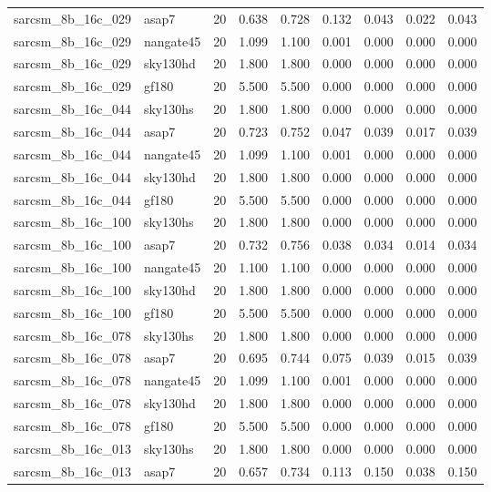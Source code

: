 \begin{tabular}{llrrrrrrr}
sarcsm\_8b\_16c\_029 & asap7 & 20 & 0.638 & 0.728 & 0.132 & 0.043 & 0.022 & 0.043 \\
sarcsm\_8b\_16c\_029 & nangate45 & 20 & 1.099 & 1.100 & 0.001 & 0.000 & 0.000 & 0.000 \\
sarcsm\_8b\_16c\_029 & sky130hd & 20 & 1.800 & 1.800 & 0.000 & 0.000 & 0.000 & 0.000 \\
sarcsm\_8b\_16c\_029 & gf180 & 20 & 5.500 & 5.500 & 0.000 & 0.000 & 0.000 & 0.000 \\
sarcsm\_8b\_16c\_044 & sky130hs & 20 & 1.800 & 1.800 & 0.000 & 0.000 & 0.000 & 0.000 \\
sarcsm\_8b\_16c\_044 & asap7 & 20 & 0.723 & 0.752 & 0.047 & 0.039 & 0.017 & 0.039 \\
sarcsm\_8b\_16c\_044 & nangate45 & 20 & 1.099 & 1.100 & 0.001 & 0.000 & 0.000 & 0.000 \\
sarcsm\_8b\_16c\_044 & sky130hd & 20 & 1.800 & 1.800 & 0.000 & 0.000 & 0.000 & 0.000 \\
sarcsm\_8b\_16c\_044 & gf180 & 20 & 5.500 & 5.500 & 0.000 & 0.000 & 0.000 & 0.000 \\
sarcsm\_8b\_16c\_100 & sky130hs & 20 & 1.800 & 1.800 & 0.000 & 0.000 & 0.000 & 0.000 \\
sarcsm\_8b\_16c\_100 & asap7 & 20 & 0.732 & 0.756 & 0.038 & 0.034 & 0.014 & 0.034 \\
sarcsm\_8b\_16c\_100 & nangate45 & 20 & 1.100 & 1.100 & 0.000 & 0.000 & 0.000 & 0.000 \\
sarcsm\_8b\_16c\_100 & sky130hd & 20 & 1.800 & 1.800 & 0.000 & 0.000 & 0.000 & 0.000 \\
sarcsm\_8b\_16c\_100 & gf180 & 20 & 5.500 & 5.500 & 0.000 & 0.000 & 0.000 & 0.000 \\
sarcsm\_8b\_16c\_078 & sky130hs & 20 & 1.800 & 1.800 & 0.000 & 0.000 & 0.000 & 0.000 \\
sarcsm\_8b\_16c\_078 & asap7 & 20 & 0.695 & 0.744 & 0.075 & 0.039 & 0.015 & 0.039 \\
sarcsm\_8b\_16c\_078 & nangate45 & 20 & 1.099 & 1.100 & 0.001 & 0.000 & 0.000 & 0.000 \\
sarcsm\_8b\_16c\_078 & sky130hd & 20 & 1.800 & 1.800 & 0.000 & 0.000 & 0.000 & 0.000 \\
sarcsm\_8b\_16c\_078 & gf180 & 20 & 5.500 & 5.500 & 0.000 & 0.000 & 0.000 & 0.000 \\
sarcsm\_8b\_16c\_013 & sky130hs & 20 & 1.800 & 1.800 & 0.000 & 0.000 & 0.000 & 0.000 \\
sarcsm\_8b\_16c\_013 & asap7 & 20 & 0.657 & 0.734 & 0.113 & 0.150 & 0.038 & 0.150 \\

\end{tabular}
